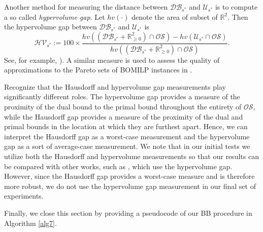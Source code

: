 \documentclass[11.5pt]{article}
\newcommand{\bb}{BB}
\newcommand{\R}{\mathbb{R}}
\newcommand{\U}{\mathcal{U}}
\newcommand{\OS}{\mathcal{OS}}
\newcommand{\nonneg}{\R^{2}_{\ge 0}}
\begin{document}
Another method for measuring the distance between $\mathcal{DB}_{s^*}$ and $\U_{s^*}$ is to compute a so called \emph{hypervolume gap}. Let $hv(\cdot)$ denote the area of subset of $\R^2$. Then the hypervolume gap between $\mathcal{DB}_{s^*}$ and $\U_{s^*}$ is
\begin{equation}
\mathcal{HV}_{s^*} := 100\times\frac{hv((\mathcal{DB}_{s^*} + \nonneg) \cap \OS) - hv(\U_{s^*} \cap \OS)}{hv((\mathcal{DB}_{s^*} + \nonneg) \cap \OS)}.
\end{equation} 
See, for example, \citet{zitzler2003performance}). A similar measure is used to assess the quality of approximations to the Pareto sets of BOMILP instances in \citep{boland2015acriterion}. 

Recognize that the Hausdorff and hypervolume gap measurements play significantly different roles. The hypervolume gap provides a measure of the proximity of the dual bound to the primal bound throughout the entirety of $\OS$, while the Hausdorff gap provides a measure of the proximity of the dual and primal bounds in the location at which they are furthest apart. Hence, we can interpret the Hausdorff gap as a worst-case measurement and the hypervolume gap as a sort of average-case measurement. We note that in our initial tests we utilize both the Hausdorff and hypervolume measurements so that our results can be compared with other works, such as \citep{boland2015acriterion}, which use the hypervolume gap. However, since the Hausdorff gap provides a worst-case measure and is therefore more robust, we do not use the hypervolume gap measurement in our final set of experiments.


Finally, we close this section by providing a pseudocode of our \bb{} procedure in Algorithm \ref{alg7}. 
\end{document}

